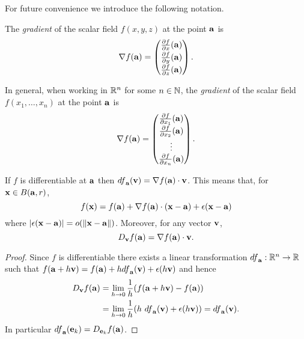 For future convenience we introduce the following notation.
%
\begin{definition}[gradient]
    The \emph{gradient} of the scalar field \(f(x,y,z)\) at the point \(\aa\) is
    \[
        \nabla f(\aa) =
        \begin{pmatrix}
            \frac{\partial f}{\partial x}(\aa) \\[2pt]
            \frac{\partial f}{\partial y}(\aa) \\[2pt]
            \frac{\partial f}{\partial z}(\aa)
        \end{pmatrix}.
    \]
\end{definition}
%
\noindent
In general, when working in \(\bR^n\) for some \(n\in\bN\), the \emph{gradient} of the scalar field \(f(x_1,\ldots,x_n)\) at the point \(\aa\) is
\[
    \nabla f(\aa) =
    \begin{pmatrix}
        \frac{\partial f}{\partial x_1}(\aa) \\[2pt]
        \frac{\partial f}{\partial x_2}(\aa) \\[2pt]
        \vdots                               \\
        \frac{\partial f}{\partial x_n}(\aa)
    \end{pmatrix}.
\]


\begin{theorem}
    If \(f\) is differentiable at \(\aa\)
    then \({df}_{\aa}(\vv) = \nabla f(\aa) \cdot \vv \).
    This means that, for \(\xx \in B(\aa,r)\),
    \[
        f(\xx) = f(\aa) +   \nabla f(\aa) \cdot (\xx-\aa) + \epsilon(\xx-\aa)
    \]
    where \(\abs{\epsilon(\xx-\aa)} = \littleo{\norm{\xx-\aa}}\).
    Moreover, for any vector \(\vv\),
    \[
        D_{\vv}f(\aa) = \nabla f(\aa) \cdot \vv.
    \]
\end{theorem}

\begin{proof}
    Since \(f\) is differentiable there exists a linear transformation \({df}_{\aa}: \bR^n \to \bR\) such that
    \(  f(\aa+ h \vv) = f(\aa) + h {df}_{\aa}(\vv) + \epsilon(h\vv)\)
    and hence
    \[
        \begin{aligned}
            D_{\vv}f(\aa) & =
            \lim_{h\to 0} \frac{1}{h}(f(\aa+h \vv) - f(\aa)) \\
                          & =
            \lim_{h\to 0} \frac{1}{h}(h \ {df}_{\aa}(\vv) + \epsilon(h\vv) )
            =  {df}_{\aa}(\vv).
        \end{aligned}
    \]
    In particular \({df}_{\aa}(\ee_k) = D_{\ee_k}f(\aa)\).
\end{proof}


